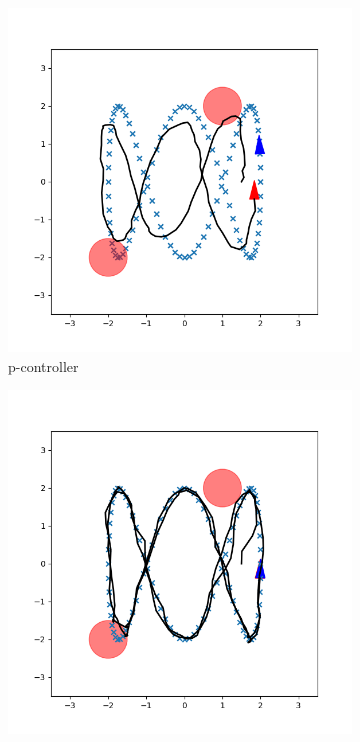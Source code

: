 \documentclass[conference]{IEEEtran}
\begin{document}
\begin{figure}
    \centering
    \begin{subfigure}[b]{0.3\textwidth}
        \includegraphics[width=\textwidth]{../fig/p_controller.png}
        \caption{p-controller}
        \label{fig:p-controller}
    \end{subfigure}
    \hfill
    \begin{subfigure}[b]{0.3\textwidth}
        \includegraphics[width=\textwidth]{../fig/trajectory.cec.png}

\end{subfigure}
\end{figure}
\end{document}
